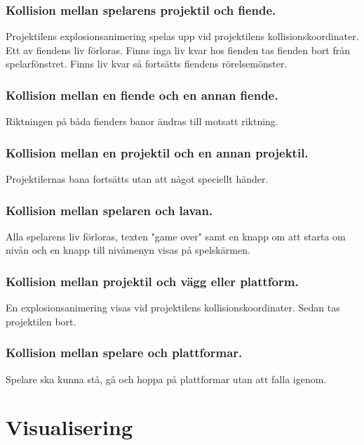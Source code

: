 \documentclass{TDP005mall}
\begin{document}
\subsubsection*{Kollision mellan spelarens projektil och fiende.\label{section:2}}
Projektilens explosionsanimering spelas upp vid projektilens kollisionskoordinater. Ett av fiendens liv förloras. Finns inga liv kvar hos fienden tas fienden bort från spelarfönstret. Finns liv kvar så fortsätts fiendens rörelsemönster.

\subsubsection*{Kollision mellan en fiende och en annan fiende.\label{section:3}}
Riktningen på båda fienders banor ändras till motsatt riktning.

\subsubsection*{Kollision mellan en projektil och en annan projektil.\label{section:4}}
Projektilernas bana fortsätts utan att något speciellt händer.

\subsubsection*{Kollision mellan spelaren och lavan.\label{section:5}}
Alla spelarens liv förloras, texten "game over" samt en knapp om att starta om nivån och en knapp till nivåmenyn visas på spelskärmen.

\subsubsection*{Kollision mellan projektil och vägg eller plattform.\label{section:6}}
En explosionsanimering visas vid projektilens kollisionskoordinater. Sedan tas projektilen bort.

\subsubsection*{Kollision mellan spelare och plattformar.\label{section:7}}
Spelare ska kunna stå, gå och hoppa på plattformar utan att falla igenom.

\newpage
\section{Visualisering}%
\end{document}
